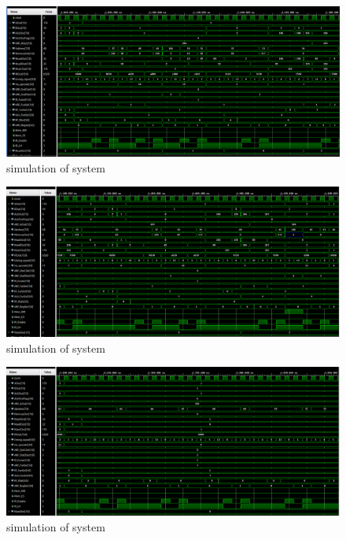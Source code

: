 \documentclass[pdftex,12pt,a4paper]{article}
\begin{document}
\begin{figure}[H]
    \centering
    \includegraphics[width=1\textwidth]{photos/system_result_11.png}	
    \caption{simulation of system}
    \label{implementation}
\end{figure}

\begin{figure}[H]
    \centering
    \includegraphics[width=1\textwidth]{photos/system_result_12.png}	
    \caption{simulation of system}
    \label{implementation}
\end{figure}

\begin{figure}[H]
    \centering
    \includegraphics[width=1\textwidth]{photos/system_result_13.png}	
    \caption{simulation of system}
    \label{implementation}
\end{figure}
\end{document}
